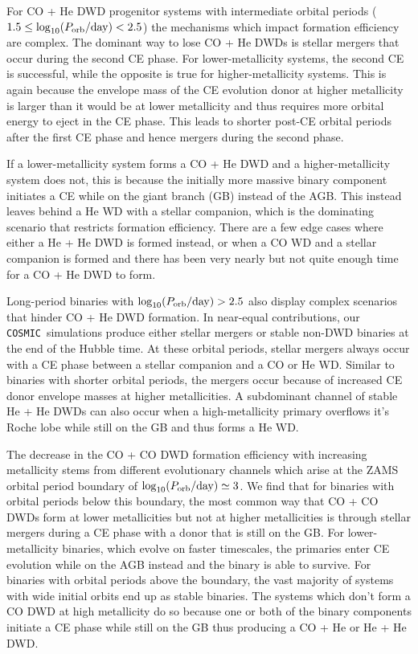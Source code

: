 \documentclass[twocolumn]{aastex631}
\newcommand{\cosmic}{\texttt{COSMIC}}
\begin{document}
For CO + He DWD progenitor systems with intermediate orbital periods ($1.5\leq \log_{10}(P_{\rm{orb}}/\rm{day})< 2.5$) the mechanisms which impact formation efficiency are complex. The dominant way to lose CO + He DWDs is stellar mergers that occur during the second CE phase. For lower-metallicity systems, the second CE is successful, while the opposite is true for higher-metallicity systems. This is again because the envelope mass of the CE evolution donor at higher metallicity is larger than it would be at lower metallicity and thus requires more orbital energy to eject in the CE phase. This leads to shorter post-CE orbital periods after the first CE phase and hence mergers during the second phase.

If a lower-metallicity system forms a CO + He DWD and a higher-metallicity system does not, this is because the initially more massive binary component initiates a CE while on the giant branch (GB) instead of the AGB. This instead leaves behind a He WD with a stellar companion, which is the dominating scenario that restricts formation efficiency. There are a few edge cases where either a He + He DWD is formed instead, or when a CO WD and a stellar companion is formed and there has been very nearly but not quite enough time for a CO + He DWD to form. 

Long-period binaries with $\log_{10}(P_{\rm{orb}}/\rm{day})>2.5$ also display complex scenarios that hinder CO + He DWD formation. In near-equal contributions, our \cosmic\ simulations produce either stellar mergers or stable non-DWD binaries at the end of the Hubble time. At these orbital periods, stellar mergers always occur with a CE phase between a stellar companion and a CO or He WD. Similar to binaries with shorter orbital periods, the mergers occur because of increased CE donor envelope masses at higher metallicities. A subdominant channel of stable He + He DWDs can also occur when a high-metallicity primary overflows it's Roche lobe while still on the GB and thus forms a He WD.

The decrease in the CO + CO DWD formation efficiency with increasing metallicity stems from different evolutionary channels which arise at the ZAMS orbital period boundary of $\log_{10}(P_{\rm{orb}}/\rm{day})\simeq3$. We find that for binaries with orbital periods below this boundary, the most common way that CO + CO DWDs form at lower metallicities but not at higher metallicities is through stellar mergers during a CE phase with a donor that is still on the GB. For lower-metallicity binaries, which evolve on faster timescales, the primaries enter CE evolution while on the AGB instead and the binary is able to survive. For binaries with orbital periods above the boundary, the vast majority of systems with wide initial orbits end up as stable binaries. The systems which don’t form a CO DWD at high metallicity do so because one or both of the binary components initiate a CE phase while still on the GB thus producing a CO + He or He + He DWD. 
\end{document}
